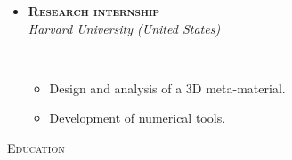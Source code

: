 \documentclass[11pt, a4paper]{article}
\newcommand{\dates}[1]{\hfill\mbox{\textbf{#1}}} %
\newcommand{\smaller}[1]{{\small\ #1}}
\newcommand{\headright}[1]{
    \vspace*{1.5ex}\textsc{\Large\color{cvblue}#1}\par%
    \vspace*{-2ex}{\color{cvblue}\hrulefill}\par
}
\begin{document}
\begin{minipage}[t]{0.56\textwidth}
\begin{itemize}
        \textbf{\textsc{Postdoctoral researcher Valorization}} \dates{\MyDateValorization}
        \vspace*{0.1eM}
        \\
        \textit{M2i \& Tata Steel (The Netherlands)}
        \vspace*{0.2eM}
        \smaller{%
            \begin{itemize}
                \item Acquisition and management of funding (10 k\euro).
                \item Developed industrial tool for scanning electron microscopy.
            \end{itemize}
        }
        \vspace*{0.2eM}
        \item
        \textbf{\textsc{Research internship}} \dates{\MyDateHarvard}
        \vspace*{0.1eM}
        \\
        \textit{Harvard University (United States)}
        \vspace*{0.2eM}
        \smaller{%
            \begin{itemize}
                \item Design and analysis of a 3D meta-material.
                \item Development of numerical tools.
            \end{itemize}
        }
    \end{itemize}

    \vspace*{-0.5eM}
    \headright{Education}


\end{minipage}
\end{document}
